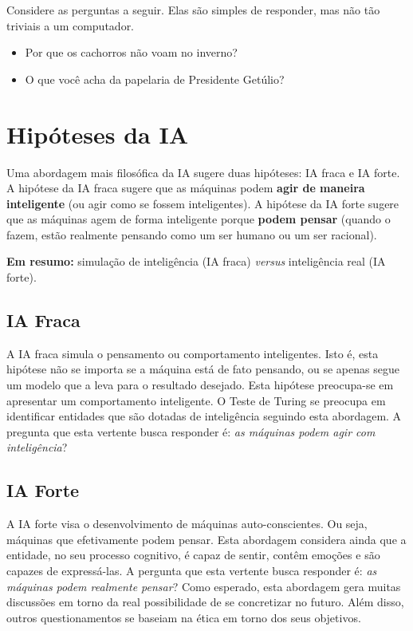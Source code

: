 \insertspace
	
Considere as perguntas a seguir. Elas são simples de responder, mas não tão triviais a um computador.
\begin{itemize}
	\item Por que os cachorros não voam no inverno?
	\item O que você acha da papelaria de Presidente Getúlio?
\end{itemize}

\section{Hipóteses da IA}

Uma abordagem mais filosófica da IA sugere duas hipóteses: IA fraca e IA forte. A hipótese da IA fraca sugere que as máquinas podem \textbf{agir de maneira inteligente} (ou agir como se fossem inteligentes). A hipótese da IA forte sugere que as máquinas agem de forma inteligente porque \textbf{podem pensar} (quando o fazem, estão realmente pensando como um ser humano ou um ser racional).

\textbf{Em resumo:} simulação de inteligência (IA fraca) \textit{versus} inteligência real (IA forte).

\subsection{IA Fraca}
A IA fraca simula o pensamento ou comportamento inteligentes. Isto é, esta hipótese não se importa se a máquina está de fato pensando, ou se apenas segue um modelo que a leva para o resultado desejado. Esta hipótese preocupa-se em apresentar um comportamento inteligente. O Teste de Turing se preocupa em identificar entidades que são dotadas de inteligência seguindo esta abordagem. A pregunta que esta vertente busca responder é: \textit{as máquinas podem agir com inteligência}?

\subsection{IA Forte}

A IA forte visa o desenvolvimento de máquinas auto-conscientes. Ou seja, máquinas que efetivamente podem pensar. Esta abordagem considera ainda que a entidade, no seu processo cognitivo, é capaz de sentir, contêm emoções e são capazes de expressá-las. A pergunta que esta vertente busca responder é: \textit{as máquinas podem realmente pensar}? Como esperado, esta abordagem gera muitas discussões em torno da real possibilidade de se concretizar no futuro. Além disso, outros questionamentos se baseiam na ética em torno dos seus objetivos.

